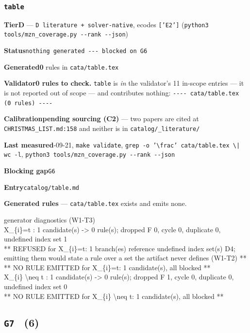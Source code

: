 \documentclass[10pt,a4paper]{article}
\newcommand{\entryfield}[2]{{\raggedright\textbf{#1}\quad #2\par}}
\newcommand{\diag}[1]{{\small\itshape\raggedright #1\par}}
\begin{document}
\subsubsection*{\texttt{table}}
\label{entry:table}
\entryfield{Tier}{\textbf{D} --- \texttt{D literature + solver-\allowbreak{}native}, ecodes \texttt{['E2']} (\texttt{python3 tools/\allowbreak{}mzn\_\allowbreak{}coverage.\allowbreak{}py -\allowbreak{}-\allowbreak{}rank -\allowbreak{}-\allowbreak{}json})}
\entryfield{Status}{\texttt{nothing generated -\allowbreak{}-\allowbreak{}-\allowbreak{} blocked on G6}}
\entryfield{Generated}{\textbf{0} rules in \texttt{cata/table.tex}}
\entryfield{Validator}{\textbf{0 rules to check.} \texttt{table} is \emph{in} the validator's 11 in-scope entries --- it is not reported out of scope --- and contributes nothing: \texttt{-\allowbreak{}-\allowbreak{}-\allowbreak{}-\allowbreak{} cata/\allowbreak{}table.\allowbreak{}tex  (0 rules) -\allowbreak{}-\allowbreak{}-\allowbreak{}-\allowbreak{}}}
\entryfield{Calibration}{\textbf{pending sourcing (C2)} --- two papers are cited at \texttt{CHRISTMAS\_LIST.md:158} and neither is in \texttt{catalog/\_literature/}}
\entryfield{Last measured}{2026-09-21, \texttt{make validate}, \texttt{grep -\allowbreak{}o '\textbackslash{}frac' cata/\allowbreak{}table.\allowbreak{}tex \textbackslash{}| wc -\allowbreak{}l}, \texttt{python3 tools/\allowbreak{}mzn\_\allowbreak{}coverage.\allowbreak{}py -\allowbreak{}-\allowbreak{}rank -\allowbreak{}-\allowbreak{}json}}
\entryfield{Blocking gap}{\texttt{G6}}
\entryfield{Entry}{\texttt{catalog/table.md}}

\textbf{Generated rules} --- \texttt{cata/table.tex} exists and emits none.

\diag{generator diagnostics (W1-T3)\\{} X\_\{i\}=t : 1 candidate(s) -> 0 rule(s); dropped F 0, cycle 0, duplicate 0, undefined index set 1\\{}   ** REFUSED for X\_\{i\}=t: 1 branch(es) reference undefined index set(s) D4; emitting them would state a rule over a set the artifact never defines (W1-T2) **\\{}   ** NO RULE EMITTED for X\_\{i\}=t: 1 candidate(s), all blocked **\\{} X\_\{i\} \textbackslash{}neq t : 1 candidate(s) -> 0 rule(s); dropped F 1, cycle 0, duplicate 0, undefined index set 0\\{}   ** NO RULE EMITTED for X\_\{i\} \textbackslash{}neq t: 1 candidate(s), all blocked **}
\subsection*{\texttt{G7} \ \normalsize(6)}
\end{document}
